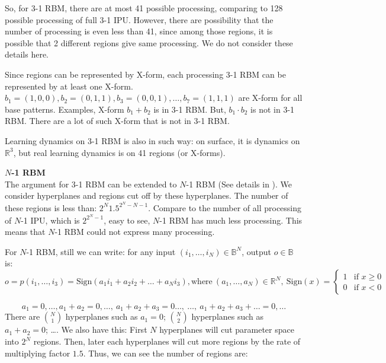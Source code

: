 So, for 3-1 RBM, there are at most 41 possible processing, comparing to 128 possible processing of full 3-1 IPU. However, there are possibility that the number of processing is even less than 41, since among those regions, it is possible that 2 different regions give same processing. We do not consider these details here. 

Since regions can be represented by X-form, each processing 3-1 RBM can be represented by at least one X-form.  $b_1 = (1,0,0), b_2 = (0,1,1), b_3=(0,0,1), \ldots, b_7 = (1,1,1)$ are X-form for all base patterns. Examples, X-form $b_1 + b_2$ is in 3-1 RBM.  But, $b_1 \cdot b_2$ is not in 3-1 RBM. There are a lot of such X-form that is not in 3-1 RBM.

Learning dynamics on 3-1 RBM is also in such way: on surface, it is dynamics on $\mathbb{R}^3$, but real learning dynamics is on 41 regions (or X-forms). 
\bigskip




{\bf $N$-1 RBM} \\
The argument for 3-1 RBM can be extended to $N$-1 RBM (See details in \cite{paper2}). We consider hyperplanes and regions cut off by these hyperplanes. The number of these regions is less than:  $2^N 1.5^{2^N-N-1}$. Compare to the number of all processing of $N$-1 IPU, which is $2^{2^N - 1}$, easy to see, $N$-1 RBM has much less processing. This means that $N$-1 RBM could not express many processing. 

For $N$-1 RBM, still we can write: for any input $(i_1, \ldots, i_N) \in \mathbb{B}^N$, output $o \in \mathbb{B}$ is:
$$
o = p(i_1, \ldots, i_3) = \text{Sign}(a_1 i_1 + a_2  i_2 + \ldots + a_N i_3), \text{where} \ (a_1, \ldots, a_N) \in \mathbb{R}^N, \ \text{Sign}(x) =
\left\{
	\begin{array}{ll}
		1  & \mbox{if } x \ge 0 \\
		0  & \mbox{if } x < 0
	\end{array}
\right.
$$


\begin{equation}
a_1 = 0, \ldots, a_1+a_2 = 0, \ldots, \ a_1+a_2+a_3 =0 \ldots, \ \ldots, \ a_1+a_2+a_3+\ldots = 0, \ldots
\end{equation}
There are $ {N\choose 1} $ hyperplanes such as $a_1 = 0$;  $ {N\choose 2} $ hyperplanes such as $a_1+a_2 = 0$;
\ldots. We also have this: First $N$ hyperplanes will cut parameter space into $2^N$ regions. Then, later each hyperplanes will cut more regions by the rate of multiplying factor $1.5$. Thus, we can see the number of regions are:

